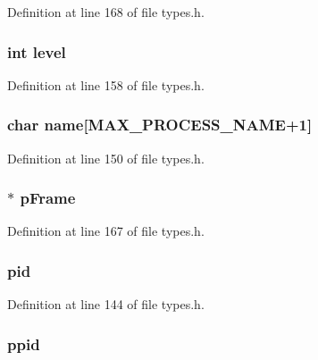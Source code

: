 Definition at line 168 of file types.h.

\hypertarget{structprocess__t_acf4d33ee4cff36f69b924471174dcb11}{
\subsubsection[{level}]{\setlength{\rightskip}{0pt plus 5cm}int {\bf level}}}
\label{structprocess__t_acf4d33ee4cff36f69b924471174dcb11}


Definition at line 158 of file types.h.

\hypertarget{structprocess__t_a69756b34768c5818fb406d341c9b3e74}{
\subsubsection[{name}]{\setlength{\rightskip}{0pt plus 5cm}char {\bf name}\mbox{[}MAX\_\-PROCESS\_\-NAME+1\mbox{]}}}
\label{structprocess__t_a69756b34768c5818fb406d341c9b3e74}


Definition at line 150 of file types.h.

\hypertarget{structprocess__t_afa88d15da39ad6f87338267449baaa26}{
\subsubsection[{pFrame}]{$\ast$ {\bf pFrame}}}
\label{structprocess__t_afa88d15da39ad6f87338267449baaa26}


Definition at line 167 of file types.h.

\hypertarget{structprocess__t_ae0d46a978d5cd6707411f276ad869b9c}{
\subsubsection[{pid}]{ {\bf pid}}}
\label{structprocess__t_ae0d46a978d5cd6707411f276ad869b9c}


Definition at line 144 of file types.h.

\hypertarget{structprocess__t_a812d4e1057eab93f0c388dc6c00b2cf8}{
\subsubsection[{ppid}]{ {\bf ppid}}}
\label{structprocess__t_a812d4e1057eab93f0c388dc6c00b2cf8}


